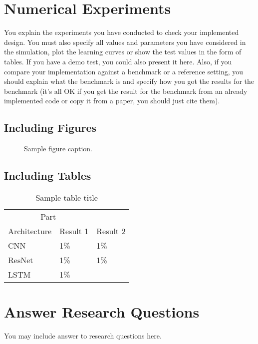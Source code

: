 \documentclass{article}
\begin{document}
\section{Numerical Experiments}

You explain the experiments you have conducted to check your implemented design. You must also specify all values and parameters you have considered in the simulation, plot the learning curves or show the test values in the form of tables. If you have a demo test, you could also present it here. Also, if you compare your implementation against a benchmark or a reference setting, you should explain what the benchmark is and specify how you got the results for the benchmark (it's all OK if you get the result for the benchmark from an already implemented code or copy it from a paper, you should just cite them).

\subsection{Including Figures}


\begin{figure}
  \centering
  \fbox{\rule[-.5cm]{0cm}{4cm} \rule[-.5cm]{4cm}{0cm}}
  \caption{Sample figure caption.}
\end{figure}



\subsection{Including Tables}

\begin{table}
  \caption{Sample table title}
  \label{sample-table}
  \centering
  \begin{tabular}{lll}
    \toprule
    \multicolumn{2}{c}{Part}                   \\
    \cmidrule(r){1-2}
    Architecture     & Result 1     & Result 2 \\
    \midrule
    CNN & 1\%  &1\%   \\
    ResNet     &1\% &1\%      \\
    LSTM     &1\%       &   \\
    \bottomrule
  \end{tabular}
\end{table}

\section{Answer Research Questions}
You may include answer to research questions here.
	
\end{document}
